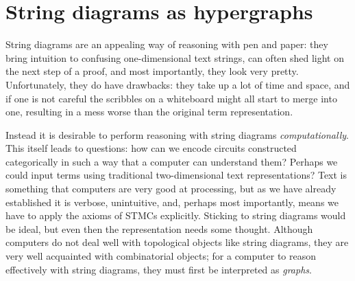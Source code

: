\chapter{String diagrams as hypergraphs}

String diagrams are an appealing way of reasoning with pen and paper: they bring
intuition to confusing one-dimensional text strings, can often shed light on the
next step of a proof, and most importantly, they look very pretty.
Unfortunately, they do have drawbacks: they take up a lot of time and space, and
if one is not careful the scribbles on a whiteboard might all start to merge
into one, resulting in a mess worse than the original term representation.

Instead it is desirable to perform reasoning with string diagrams
\emph{computationally}.
This itself leads to questions: how can we encode circuits constructed
categorically in such a way that a computer can understand them?
Perhaps we could input terms using traditional two-dimensional text
representations?
Text is something that computers are very good at processing, but as we have
already established it is verbose, unintuitive, and, perhaps most importantly,
means we have to apply the axioms of STMCs explicitly.
Sticking to string diagrams would be ideal, but even then the representation
needs some thought.
Although computers do not deal well with topological objects like string
diagrams, they are very well acquainted with combinatorial objects; for
a computer to reason effectively with string diagrams, they must first be
interpreted as \emph{graphs}.








